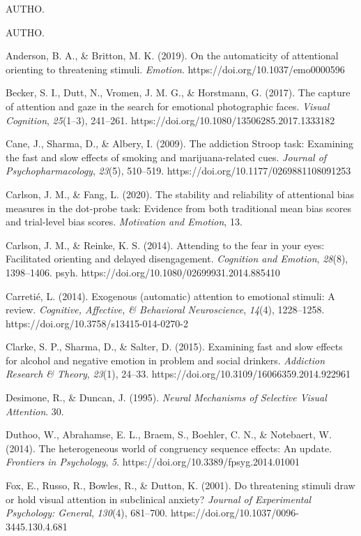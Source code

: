 \documentclass{article}
\begin{document}
AUTHO\parencite{R2020}. 

AUTHO\parencite{R2014}. 

Anderson, B. A., \& Britton, M. K. (2019). On the automaticity of attentional orienting to threatening stimuli. \emph{Emotion}. https://doi.org/10.1037/emo0000596

Becker, S. I., Dutt, N., Vromen, J. M. G., \& Horstmann, G. (2017). The capture of attention and gaze in the search for emotional photographic faces. \emph{Visual Cognition}, \emph{25}(1--3), 241--261. https://doi.org/10.1080/13506285.2017.1333182

Cane, J., Sharma, D., \& Albery, I. (2009). The addiction Stroop task: Examining the fast and slow effects of smoking and marijuana-related cues. \emph{Journal of Psychopharmacology}, \emph{23}(5), 510--519. https://doi.org/10.1177/0269881108091253

Carlson, J. M., \& Fang, L. (2020). The stability and reliability of attentional bias measures in the dot-probe task: Evidence from both traditional mean bias scores and trial-level bias scores. \emph{Motivation and Emotion}, 13.

Carlson, J. M., \& Reinke, K. S. (2014). Attending to the fear in your eyes: Facilitated orienting and delayed disengagement. \emph{Cognition and Emotion}, \emph{28}(8), 1398--1406. psyh. https://doi.org/10.1080/02699931.2014.885410

Carretié, L. (2014). Exogenous (automatic) attention to emotional stimuli: A review. \emph{Cognitive, Affective, \& Behavioral Neuroscience}, \emph{14}(4), 1228--1258. https://doi.org/10.3758/s13415-014-0270-2

Clarke, S. P., Sharma, D., \& Salter, D. (2015). Examining fast and slow effects for alcohol and negative emotion in problem and social drinkers. \emph{Addiction Research \& Theory}, \emph{23}(1), 24--33. https://doi.org/10.3109/16066359.2014.922961

Desimone, R., \& Duncan, J. (1995). \emph{Neural Mechanisms of Selective Visual Attention}. 30.

Duthoo, W., Abrahamse, E. L., Braem, S., Boehler, C. N., \& Notebaert, W. (2014). The heterogeneous world of congruency sequence effects: An update. \emph{Frontiers in Psychology}, \emph{5}. https://doi.org/10.3389/fpsyg.2014.01001

Fox, E., Russo, R., Bowles, R., \& Dutton, K. (2001). Do threatening stimuli draw or hold visual attention in subclinical anxiety? \emph{Journal of Experimental Psychology: General}, \emph{130}(4), 681--700. https://doi.org/10.1037/0096-3445.130.4.681
\end{document}
